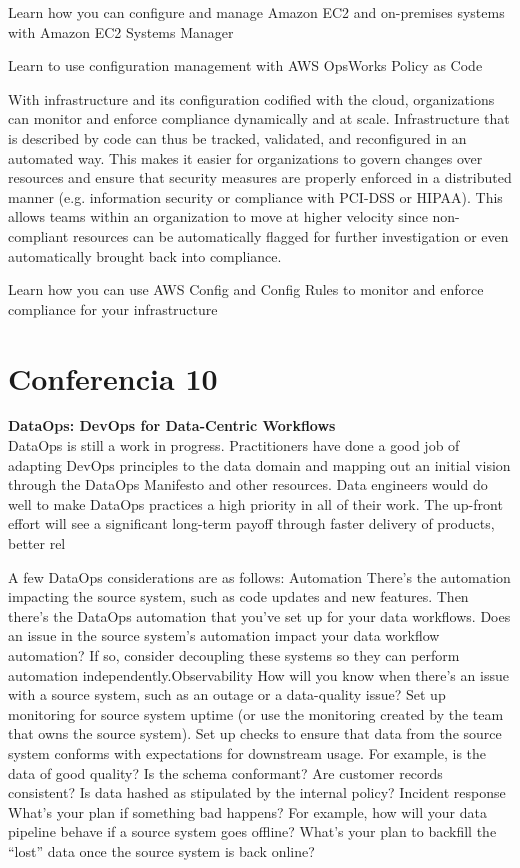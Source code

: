 \documentclass[12pt]{book}
\begin{document}
Learn how you can configure and manage Amazon EC2 and on-premises systems with Amazon EC2 Systems Manager

Learn to use configuration management with AWS OpsWorks
Policy as Code

With infrastructure and its configuration codified with the cloud, organizations can monitor and enforce compliance dynamically and at scale. Infrastructure that is described by code can thus be tracked, validated, and reconfigured in an automated way. This makes it easier for organizations to govern changes over resources and ensure that security measures are properly enforced in a distributed manner (e.g. information security or compliance with PCI-DSS or HIPAA). This allows teams within an organization to move at higher velocity since non-compliant resources can be automatically flagged for further investigation or even automatically brought back into compliance.

Learn how you can use AWS Config and Config Rules to monitor and enforce compliance for your infrastructure

\chapter{Conferencia 10}
\normalfont\LARGE \textbf{DataOps: DevOps for Data-Centric Workflows}
\normalfont\small\\
DataOps is still a work in progress. Practitioners have done a
good job of adapting DevOps principles to the data domain and mapping
out an initial vision through the DataOps Manifesto and other resources.
Data engineers would do well to make DataOps practices a high priority in
all of their work. The up-front effort will see a significant long-term payoff
through faster delivery of products, better rel

A few DataOps considerations are as follows:
Automation
There's the automation impacting the source system, such as code
updates and new features. Then there's the DataOps automation that
you've set up for your data workflows. Does an issue in the source
system's automation impact your data workflow automation? If so,
consider decoupling these systems so they can perform automation
independently.Observability
How will you know when there's an issue with a source system, such as
an outage or a data-quality issue? Set up monitoring for source system
uptime (or use the monitoring created by the team that owns the source
system). Set up checks to ensure that data from the source system
conforms with expectations for downstream usage. For example, is the
data of good quality? Is the schema conformant? Are customer records
consistent? Is data hashed as stipulated by the internal policy?
Incident response
What's your plan if something bad happens? For example, how will
your data pipeline behave if a source system goes offline? What's your
plan to backfill the “lost” data once the source system is back online?
\end{document}
